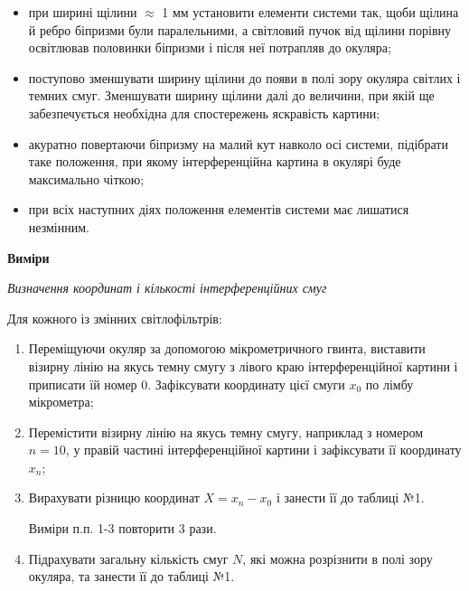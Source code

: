 \documentclass[12pt,a4paper]{article}
\begin{document}
    \begin{itemize}

        \item при ширині щілини $\approx$ 1 мм установити елементи системи так, щоби щілина й
        ребро біпризми були паралельними, а світловий пучок від щілини порівну освітлював
        половинки біпризми і після неї потрапляв до окуляра;

        \item поступово зменшувати ширину щілини до появи в полі зору окуляра світлих і
        темних смуг. Зменшувати ширину щілини далі до величини,
        при якій ще забезпечується необхідна для спостережень яскравість картини;

        \item акуратно повертаючи біпризму на малий кут навколо осі системи,
        підібрати таке положення, при якому інтерференційна картина в окулярі буде
        максимально чіткою;

        \item при всіх наступних діях положення елементів системи має лишатися незмінним.
    
    \end{itemize}

    \begin{center} \textbf{Виміри} \end{center}

    \begin{center} \textit{Визначення координат і кількості інтерференційних смуг} \end{center}

    Для кожного із змінних світлофільтрів:

    \begin{enumerate}
        \item Переміщуючи окуляр за допомогою мікрометричного гвинта, виставити візирну
        лінію на якусь темну смугу з лівого краю інтерференційної картини і приписати
        їй номер 0. Зафіксувати координату цієї смуги $x_0$ по лімбу мікрометра;

        \item Перемістити візирну лінію на якусь темну смугу, наприклад з номером
        $n = 10$, у правій частині інтерференційної картини і зафіксувати її координату $x_n$;

        \item Вирахувати різницю координат $X = x_n - x_0$ і занести її до таблиці №1.
        
        Виміри п.п. 1-3 повторити 3 рази.

        \item Підрахувати загальну кількість смуг $N$, які можна розрізнити в полі
        зору окуляра, та занести її до таблиці №1.

    \end{enumerate}
\end{document}
